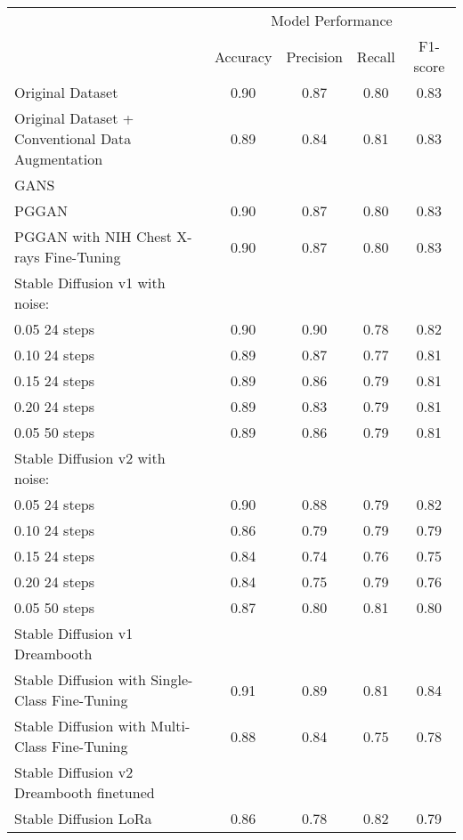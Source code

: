 \begin{table}[H]
\centering
\begin{tabular}{lcccc}
\toprule
\multirow{2}{*}{} & \multicolumn{4}{c}{Model Performance} \\
\cmidrule(lr){2-5}
  & Accuracy & Precision & Recall & F1-score \\
\midrule
Original Dataset & 0.90 & 0.87 & 0.80 & 0.83 \\
\midrule
Original Dataset + Conventional Data Augmentation & 0.89 & 0.84 & 0.81 & 0.83 \\
\midrule
GANS & \\
PGGAN  & 0.90 & 0.87 & 0.80 & 0.83 \\
PGGAN with NIH Chest X-rays Fine-Tuning & 0.90 & 0.87 & 0.80 & 0.83 \\
\midrule
Stable Diffusion v1 with noise: & \\
0.05 24 steps & 0.90 & 0.90 & 0.78 & 0.82 \\
0.10 24 steps & 0.89 & 0.87 & 0.77 & 0.81 \\
0.15 24 steps & 0.89 & 0.86 & 0.79 & 0.81 \\
0.20 24 steps & 0.89  & 0.83 & 0.79 & 0.81 \\
0.05 50 steps & 0.89 & 0.86 & 0.79 & 0.81 \\
\midrule
Stable Diffusion v2 with noise: & \\
0.05 24 steps & 0.90 & 0.88 & 0.79 & 0.82 \\
0.10 24 steps & 0.86 & 0.79 & 0.79 & 0.79 \\
0.15 24 steps & 0.84 & 0.74 & 0.76 & 0.75 \\
0.20 24 steps & 0.84 & 0.75 & 0.79 & 0.76 \\
0.05 50 steps & 0.87 & 0.80 & 0.81 & 0.80 \\
\midrule
Stable Diffusion v1 Dreambooth & \\
Stable Diffusion with Single-Class Fine-Tuning & 0.91 & 0.89 & 0.81 & 0.84 \\
Stable Diffusion with Multi-Class Fine-Tuning & 0.88 & 0.84 & 0.75 & 0.78 \\
\midrule
Stable Diffusion v2 Dreambooth finetuned & \\
Stable Diffusion LoRa & 0.86 & 0.78 & 0.82 & 0.79 \\
\bottomrule
\end{tabular}
\caption{}
\label{tab:model_performance_without_fid}
\end{table}
